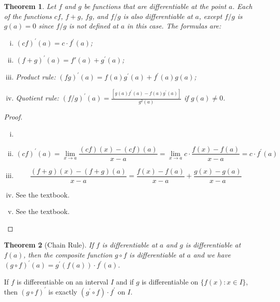 \documentclass[12pt, lettersize]{book}
\theoremstyle{plain}
\newtheorem{thm}{Theorem}[section]
\theoremstyle{definition}
\theoremstyle{remark}
\begin{document}
			\begin{thm}\label{def:28.3}
			Let $f$ and $g$ be functions that are differentiable at the point $a$. Each of the functions $cf$, $f+g$, $fg$, and $f/g$ is also differentiable at $a$, except $f/g$ is $g(a)=0$ since $f/g$ is not defined at $a$ in this case.
			The formulas are:
			\begin{enumerate}[(i)]
				\item $(cf)^\prime(a)=c\cdot f^\prime(a)$;
				\item $(f+g)^\prime(a)=f\prime(a)+g^\prime(a)$;
				\item Product rule: $(fg)^\prime(a)=f(a)g^\prime(a)+f^\prime(a)g(a)$;
				\item Quotient rule: $(f/g)^\prime(a)=\frac{[g(a)f^\prime(a)-f(a)g^\prime(a)]}{g^2(a)}$ if $g(a)\neq0$.
			\end{enumerate}
			\end{thm}
			\begin{proof}
			\begin{enumerate}[(i)]
				\item[]
				\item
				\begin{displaymath}
					(cf)^\prime(a)=\lim_{x\rightarrow a}\frac{(cf)(x)-(cf)(a)}{x-a}=\lim_{x\rightarrow a}c\cdot\frac{f(x)-f(a)}{x-a}=c\cdot f^\prime(a)
				\end{displaymath} 
				\item
				\begin{displaymath}
					\frac{(f+g)(x)-(f+g)(a)}{x-a}=\frac{f(x)-f(a)}{x-a}+\frac{g(x)-g(a)}{x-a}
				\end{displaymath}
				\item See the textbook.
				\item See the textbook.
			\end{enumerate}
			\end{proof}
			
			\begin{thm}[Chain Rule]\label{def:28.4}
			If $f$ is differentiable at $a$ and $g$ is differentiable at $f(a)$, then the composite function $g\circ f$ is differentiable at $a$ and we have $(g\circ f)^\prime(a)=g^\prime(f(a))\cdot f^\prime(a)$.
			\end{thm}
			If $f$ is differentiable on an interval $I$ and if $g$ is differentiable on $\{f(x): x\in I\}$, then $(g\circ f)^\prime$ is exactly $(g^\prime\circ f)\cdot f^\prime$ on $I$.
			
\end{document}

